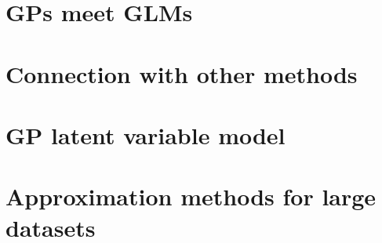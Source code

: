 \section{GPs meet GLMs}


\section{Connection with other methods}


\section{GP latent variable model}


\section{Approximation methods for large datasets}
\label{sec:Approximation-methods-for-large-datasets}


